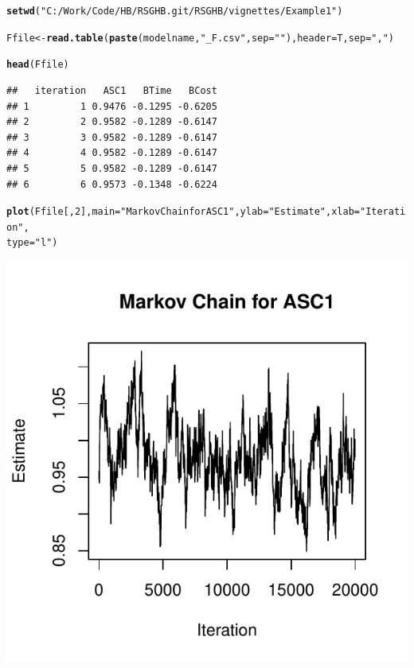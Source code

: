 \documentclass{article}\usepackage{graphicx, color}
\makeatletter
\def\maxwidth{ %
  \ifdim\Gin@nat@width>\linewidth
    \linewidth
  \else
    \Gin@nat@width
  \fi
}
\newcommand{\hlfunctioncall}[1]{\textcolor[rgb]{0.501960784313725,0,0.329411764705882}{\textbf{#1}}}%
\newcommand{\hlstring}[1]{\textcolor[rgb]{0.6,0.6,1}{#1}}%
\newenvironment{kframe}{%
 \def\at@end@of@kframe{}%
 \ifinner\ifhmode%
  \def\at@end@of@kframe{\end{minipage}}%
  \begin{minipage}{\columnwidth}%
 \fi\fi%
 \def\FrameCommand##1{\hskip\@totalleftmargin \hskip-\fboxsep
 \colorbox{shadecolor}{##1}\hskip-\fboxsep
     \hskip-\linewidth \hskip-\@totalleftmargin \hskip\columnwidth}%
 \MakeFramed {\advance\hsize-\width
   \@totalleftmargin\z@ \linewidth\hsize
   \@setminipage}}%
 {\par\unskip\endMakeFramed%
 \at@end@of@kframe}
\newenvironment{knitrout}{}{} %
\makeatother
\begin{document}
\begin{knitrout}
\color{fgcolor}\begin{kframe}
\begin{alltt}

\hlfunctioncall{setwd}(\hlstring{"C:/Work/Code/HB/RSGHB.git/RSGHB/vignettes/Example1"})

Ffile <- \hlfunctioncall{read.table}(\hlfunctioncall{paste}(modelname, \hlstring{"_F.csv"}, sep = \hlstring{""}), header = T, sep = \hlstring{","})

\hlfunctioncall{head}(Ffile)
\end{alltt}
\begin{verbatim}
##   iteration   ASC1   BTime   BCost
## 1         1 0.9476 -0.1295 -0.6205
## 2         2 0.9582 -0.1289 -0.6147
## 3         3 0.9582 -0.1289 -0.6147
## 4         4 0.9582 -0.1289 -0.6147
## 5         5 0.9582 -0.1289 -0.6147
## 6         6 0.9573 -0.1348 -0.6224
\end{verbatim}
\begin{alltt}

\hlfunctioncall{plot}(Ffile[, 2], main = \hlstring{"Markov Chain for ASC1"}, ylab = \hlstring{"Estimate"}, xlab = \hlstring{"Iteration"}, 
    type = \hlstring{"l"})
\end{alltt}
\end{kframe}
\includegraphics[width=\maxwidth]{figure/unnamed-chunk-5} 

\end{knitrout}
\end{document}

